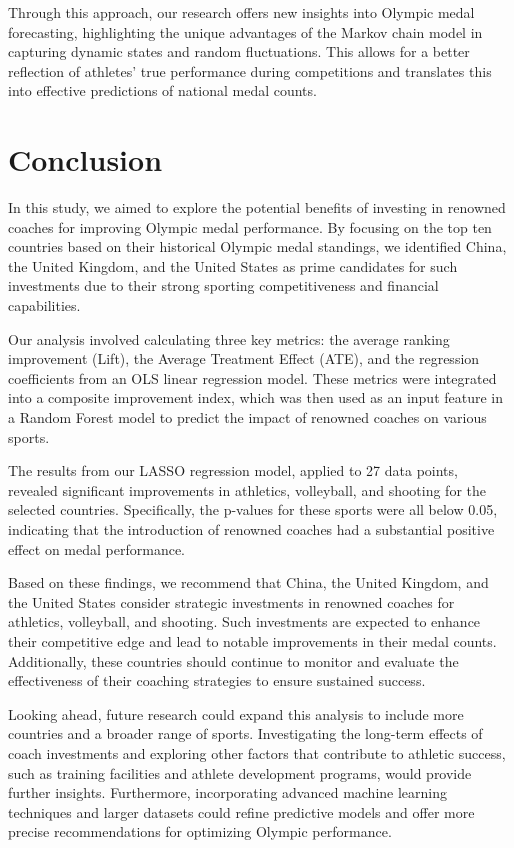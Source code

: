 \documentclass[12pt]{article}
\begin{document}
Through this approach, our research offers new insights into Olympic medal forecasting, highlighting the unique advantages of the Markov chain model in capturing dynamic states and random fluctuations. This allows for a better reflection of athletes' true performance during competitions and translates this into effective predictions of national medal counts.


\section{Conclusion}

In this study, we aimed to explore the potential benefits of investing in renowned coaches for improving Olympic medal performance. By focusing on the top ten countries based on their historical Olympic medal standings, we identified China, the United Kingdom, and the United States as prime candidates for such investments due to their strong sporting competitiveness and financial capabilities.

Our analysis involved calculating three key metrics: the average ranking improvement (Lift), the Average Treatment Effect (ATE), and the regression coefficients from an OLS linear regression model. These metrics were integrated into a composite improvement index, which was then used as an input feature in a Random Forest model to predict the impact of renowned coaches on various sports.

The results from our LASSO regression model, applied to 27 data points, revealed significant improvements in athletics, volleyball, and shooting for the selected countries. Specifically, the p-values for these sports were all below 0.05, indicating that the introduction of renowned coaches had a substantial positive effect on medal performance.

Based on these findings, we recommend that China, the United Kingdom, and the United States consider strategic investments in renowned coaches for athletics, volleyball, and shooting. Such investments are expected to enhance their competitive edge and lead to notable improvements in their medal counts. Additionally, these countries should continue to monitor and evaluate the effectiveness of their coaching strategies to ensure sustained success.

Looking ahead, future research could expand this analysis to include more countries and a broader range of sports. Investigating the long-term effects of coach investments and exploring other factors that contribute to athletic success, such as training facilities and athlete development programs, would provide further insights. Furthermore, incorporating advanced machine learning techniques and larger datasets could refine predictive models and offer more precise recommendations for optimizing Olympic performance.
\end{document}
